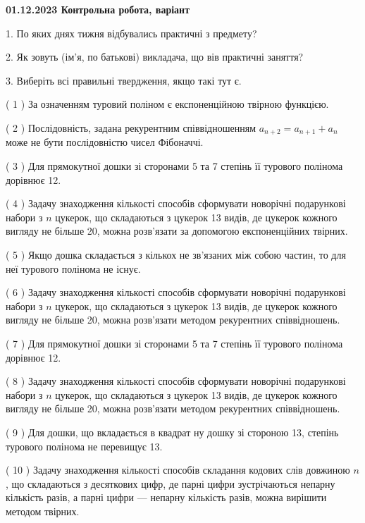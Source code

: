 \documentclass[12pt, ukrainian]{article}
\begin{document}
\vspace{4mm}
\newpage
\begin {large}

\textbf{01.12.2023 Контрольна робота, варіант  }\par


{
1. По яких днях тижня відбувались практичні з предмету?



\vspace{5mm}
2. Як зовуть (ім'я, по батькові) викладача, що вів практичні заняття?



\vspace{5mm}
3. Виберіть всі правильні твердження, якщо такі тут є.\par
\vspace{2mm}
( 1 ) За означенням туровий поліном є експоненційною твірною функцією.%

( 2 ) Послідовність, задана рекурентним співвідношенням $a_{n+2}=a_{n+1}+a_{n}$ може не бути послідовністю чисел Фібоначчі.%

( 3 ) Для прямокутної дошки зі сторонами 5 та 7 степінь її турового полінома дорівнює 12.%

( 4 ) Задачу знаходження кількості способів сформувати новорічні подарункові набори з $n$ цукерок, що складаються з цукерок 13 видів, де цукерок кожного вигляду не більше 20, можна розв’язати за допомогою експоненційних твірних.%

( 5 ) Якщо дошка складається з кількох не зв’язаних між собою частин, то для неї турового полінома не існує.%

( 6 ) Задачу знаходження кількості способів сформувати новорічні подарункові набори з $n$ цукерок, що складаються з цукерок 13 видів, де цукерок кожного вигляду не більше 20, можна розв’язати методом рекурентних співвідношень.%

( 7 ) Для прямокутної дошки зі сторонами 5 та 7 степінь її турового полінома дорівнює 12.%

( 8 ) Задачу знаходження кількості способів сформувати новорічні подарункові набори з $n$ цукерок, що складаються з цукерок 13 видів, де цукерок кожного вигляду не більше 20, можна розв’язати методом рекурентних співвідношень.%

( 9 ) Для дошки, що вкладається в квадрат ну дошку зі стороною 13, степінь турового полінома не перевищує 13.%

( 10 ) Задачу знаходження кількості способів складання кодових слів довжиною $n$, що складаються з десяткових цифр, де парні цифри зустрічаються непарну кількість разів, а парні цифри — непарну кількість разів, можна вирішити методом твірних.%
}
\end {large}
\end{document}
